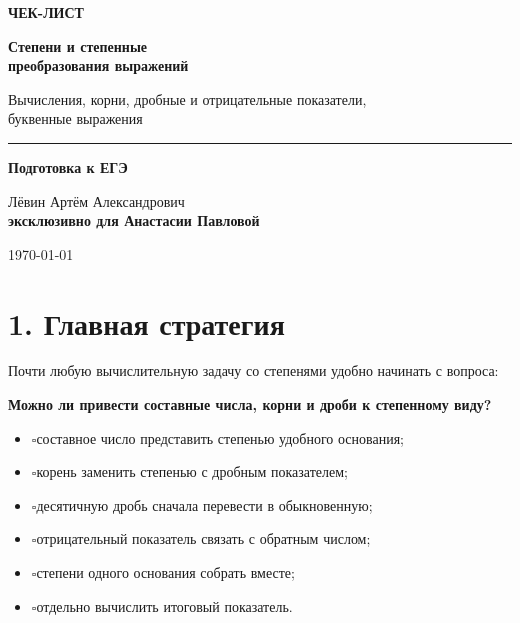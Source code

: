 \documentclass[a4paper,12pt]{article}
\newcommand{\checkitem}{\(\square\)\;}
\newcommand{\important}[1]{\textcolor{darkaccent}{\textbf{#1}}}
\begin{document}
\begin{titlepage}
\thispagestyle{empty}
\begin{center}
\vspace*{28mm}
{\Large\color{accent}\textbf{ЧЕК-ЛИСТ}}
\vspace{9mm}

{\fontsize{26}{31}\selectfont\bfseries Степени и степенные\\[2mm] преобразования выражений}
\vspace{8mm}

{\large Вычисления, корни, дробные и отрицательные показатели,\\ буквенные выражения}
\vspace{17mm}

{\color{darkaccent}\rule{55mm}{0.8pt}}
\vspace{17mm}

{\large\textbf{Подготовка к ЕГЭ}}
\vfill

{\large Лёвин Артём Александрович\\[2mm]\textbf{эксклюзивно для Анастасии Павловой}}
\vspace{8mm}

{\color{softgray}\today}
\vspace{23mm}
\end{center}
\end{titlepage}

\section*{1. Главная стратегия}
Почти любую вычислительную задачу со степенями удобно начинать с вопроса:
\begin{center}
\important{Можно ли привести составные числа, корни и дроби к степенному виду?}
\end{center}
\begin{itemize}
\item \checkitem составное число представить степенью удобного основания;
\item \checkitem корень заменить степенью с дробным показателем;
\item \checkitem десятичную дробь сначала перевести в обыкновенную;
\item \checkitem отрицательный показатель связать с обратным числом;
\item \checkitem степени одного основания собрать вместе;
\item \checkitem отдельно вычислить итоговый показатель.
\end{itemize}
\end{document}
